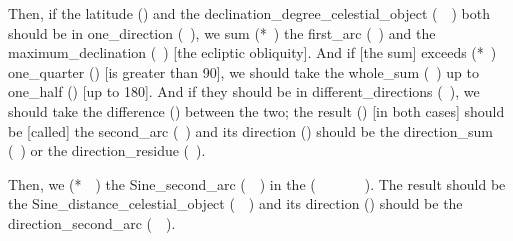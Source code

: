 \noindent\normalmarginpar{}

\clearpage{}

\noindent\reversemarginpar{}%
Then, if the \gls{latitude} (\ard) and the \gls{declination_degree_celestial_object} (\mayl\idafaconsonant\ \daraji\idafavowel\ \kawkab) both should be in \gls{one_direction} (\yik\ \jahat), we \gls{sum} (*\jam\ \kardan) the \gls{first_arc} (\qaws\idafaconsonant\ \avval) and the \gls{maximum_declination} (\mayl\idafaconsonant\ \kulli) [\ie the ecliptic obliquity]. And if [the sum] \gls{exceeds} (*\ziyadi\ \shudan) \gls{one_quarter} (\rabi) [\ie is greater than 90\degree], we should take the \gls{whole_sum} (\tamam\idafaconsonant\ \majmu) up to \gls{one_half} (\nisf) [\ie up to 180\degree]. And if they should be in \gls{different_directions} (\jahat\idafaconsonant\ \mukhtalif), we should take the \gls{difference} (\tafadul) between the two; the \gls{result} (\hasil) [in both cases] should be [called] 
the \gls{second_arc} (\qaws\idafaconsonant\ \duvum) and its \gls{direction} (\jahat) should be the \gls{direction_sum} (\jahat\idafaconsonant\ \majmu) or the \gls{direction_residue} (\jahat\idafaconsonant\ \fadla). 
\medskip

\noindent\reversemarginpar{}%
Then, we  (*\munhatt\idafaconsonant\ \darb\ \kardan) the \gls{Sine_second_arc} (\jayb\idafaconsonant\ \qaws\idafaconsonant\ \duvum) in the  (\jayb\idafaconsonant\ \tamam\idafaconsonant\ \bud\ \az\ \guillemotleft\dayiri\idafavowel\ \marri\ \biaqtab\idafaconsonant\ \arbai\guillemotright). The result should be the \gls{Sine_distance_celestial_object} (\jayb\idafaconsonant\ \bud\idafaconsonant\ \kawkab) and its \gls{direction} (\jahat) should be the \gls{direction_second_arc}  (\jahat\idafaconsonant\ \qaws\idafaconsonant\ \duvum). 

